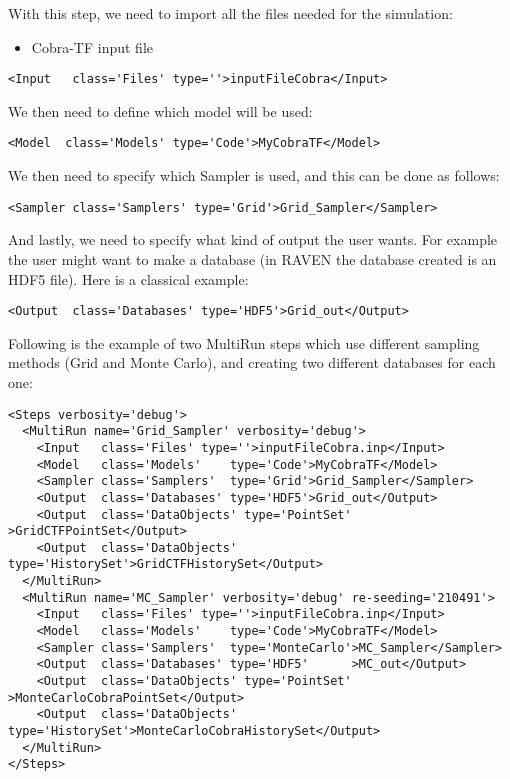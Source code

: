 With this step, we need to import all the files needed for the simulation:
\begin{itemize}
  \item Cobra-TF input file
\end{itemize}
\begin{lstlisting}[style=XML,morekeywords={name,class,type}]
    <Input   class='Files' type=''>inputFileCobra</Input>
\end{lstlisting}
We then need to define which model will be used:
\begin{lstlisting}[style=XML]
    <Model  class='Models' type='Code'>MyCobraTF</Model>
\end{lstlisting}
We then need to specify which Sampler is used, and this can be done as follows:
\begin{lstlisting}[style=XML]
    <Sampler class='Samplers' type='Grid'>Grid_Sampler</Sampler>
\end{lstlisting}
And lastly, we need to specify what kind of output the user wants.
%
For example the user might want to make a database (in RAVEN the database
created is an HDF5 file).
%
Here is a classical example:
\begin{lstlisting}[style=XML,morekeywords={class,type}]
    <Output  class='Databases' type='HDF5'>Grid_out</Output>
\end{lstlisting}
Following is the example of two MultiRun steps which use different sampling
methods (Grid and Monte Carlo), and creating two different databases for each
one:
\begin{lstlisting}[style=XML]
<Steps verbosity='debug'>
  <MultiRun name='Grid_Sampler' verbosity='debug'>
    <Input   class='Files' type=''>inputFileCobra.inp</Input>
    <Model   class='Models'    type='Code'>MyCobraTF</Model>
    <Sampler class='Samplers'  type='Grid'>Grid_Sampler</Sampler>
    <Output  class='Databases' type='HDF5'>Grid_out</Output>
    <Output  class='DataObjects' type='PointSet'   >GridCTFPointSet</Output>
    <Output  class='DataObjects' type='HistorySet'>GridCTFHistorySet</Output>
  </MultiRun>
  <MultiRun name='MC_Sampler' verbosity='debug' re-seeding='210491'>
    <Input   class='Files' type=''>inputFileCobra.inp</Input>
    <Model   class='Models'    type='Code'>MyCobraTF</Model>
    <Sampler class='Samplers'  type='MonteCarlo'>MC_Sampler</Sampler>
    <Output  class='Databases' type='HDF5'      >MC_out</Output>
    <Output  class='DataObjects' type='PointSet'   >MonteCarloCobraPointSet</Output>
    <Output  class='DataObjects' type='HistorySet'>MonteCarloCobraHistorySet</Output>
  </MultiRun>
</Steps>
\end{lstlisting}

